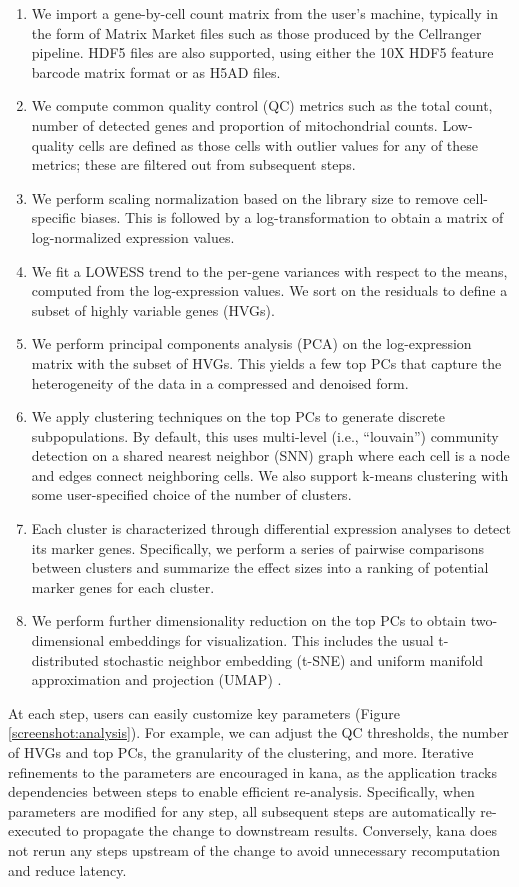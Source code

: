 \documentclass{article}
\begin{document}
\begin{enumerate}
\item We import a gene-by-cell count matrix from the user's machine, typically in the form of Matrix Market files such as those produced by the Cellranger pipeline.
HDF5 files are also supported, using either the 10X HDF5 feature barcode matrix format or as H5AD files.
\item We compute common quality control (QC) metrics such as the total count, number of detected genes and proportion of mitochondrial counts.
Low-quality cells are defined as those cells with outlier values for any of these metrics; these are filtered out from subsequent steps.
\item We perform scaling normalization based on the library size to remove cell-specific biases.
This is followed by a log-transformation to obtain a matrix of log-normalized expression values.
\item We fit a LOWESS trend \cite{cleveland1979robust} to the per-gene variances with respect to the means, computed from the log-expression values.
We sort on the residuals to define a subset of highly variable genes (HVGs). 
\item We perform principal components analysis (PCA) on the log-expression matrix with the subset of HVGs.
This yields a few top PCs that capture the heterogeneity of the data in a compressed and denoised form.
\item We apply clustering techniques on the top PCs to generate discrete subpopulations.
By default, this uses multi-level (i.e., ``louvain'') community detection on a shared nearest neighbor (SNN) graph where each cell is a node and edges connect neighboring cells.
We also support k-means clustering with some user-specified choice of the number of clusters.
\item Each cluster is characterized through differential expression analyses to detect its marker genes.
Specifically, we perform a series of pairwise comparisons between clusters and summarize the effect sizes into a ranking of potential marker genes for each cluster.
\item We perform further dimensionality reduction on the top PCs to obtain two-dimensional embeddings for visualization. 
This includes the usual t-distributed stochastic neighbor embedding (t-SNE) and uniform manifold approximation and projection (UMAP) \cite{maaten2014accelerating,mcinnes2018umap}.
\end{enumerate}

At each step, users can easily customize key parameters (Figure \ref{screenshot:analysis}).
For example, we can adjust the QC thresholds, the number of HVGs and top PCs, the granularity of the clustering, and more. 
Iterative refinements to the parameters are encouraged in kana, as the application tracks dependencies between steps to enable efficient re-analysis.
Specifically, when parameters are modified for any step, all subsequent steps are automatically re-executed to propagate the change to downstream results.
Conversely, kana does not rerun any steps upstream of the change to avoid unnecessary recomputation and reduce latency.
\end{document}

